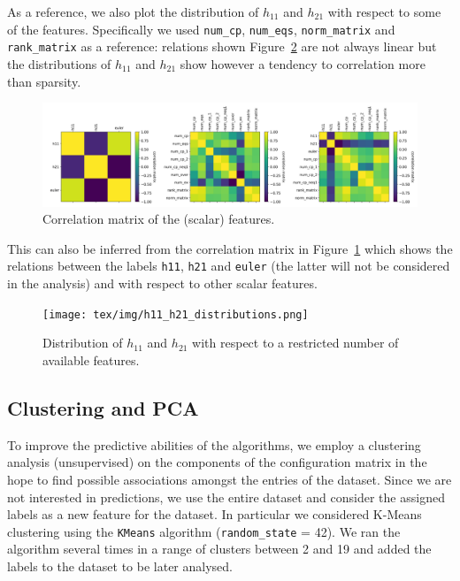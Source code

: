     As a reference, we also plot the distribution of $h_{11}$ and $h_{21}$ with respect to some of the features. Specifically we used \texttt{num\_cp}, \texttt{num\_eqs}, \texttt{norm\_matrix} and \texttt{rank\_matrix} as a reference: relations shown Figure~\ref{fig:scatter_plot_distributions} are not always linear but the distributions of $h_{11}$ and $h_{21}$ show however a tendency to correlation more than sparsity.
    
    \begin{figure}[!b]
        \centering
        \includegraphics[width=\textwidth]{tex/img/correlation_matrix.png}
        \caption{Correlation matrix of the (scalar) features.}
        \label{fig:correlation_matrix}
    \end{figure}
    
    This can also be inferred from the correlation matrix in Figure~\ref{fig:correlation_matrix} which shows the relations between the labels \texttt{h11}, \texttt{h21} and \texttt{euler} (the latter will not be considered in the analysis) and with respect to other scalar features.
    
    \begin{figure}[!t]
        \centering
        \texttt{[image: tex/img/h11\_h21\_distributions.png]}
        \caption{Distribution of $h_{11}$ and $h_{21}$ with respect to a restricted number of available features.}
        \label{fig:scatter_plot_distributions}
    \end{figure}
    
\subsection{Clustering and PCA}

    To improve the predictive abilities of the algorithms, we employ a clustering analysis (unsupervised) on the components of the configuration matrix in the hope to find possible associations amongst the entries of the dataset. Since we are not interested in predictions, we use the entire dataset and consider the assigned labels as a new feature for the dataset. In particular we considered K-Means clustering using the \texttt{KMeans} algorithm (\texttt{random\_state} = 42). We ran the algorithm several times in a range of clusters between 2 and 19 and added the labels to the dataset to be later analysed.
    
